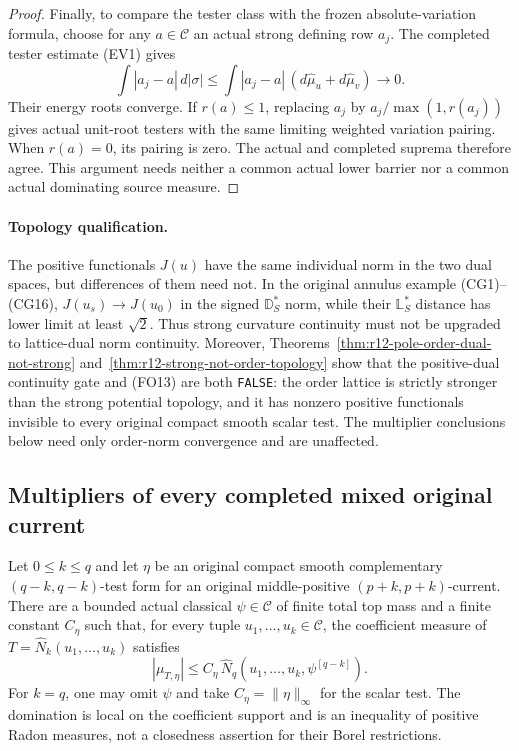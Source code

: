 \begin{proof}
Finally, to compare the tester class with the frozen
absolute-variation formula, choose for any $a\in\mathscr C$
an actual strong defining row $a_j$.  The completed tester
estimate \textup{(EV1)} gives
\[
 \int|a_j-a|\,d|\sigma|
  \le\int|a_j-a|\,(d\widehat\mu_u+d\widehat\mu_v)
                                      \longrightarrow0.
\]
Their energy roots converge.  If $r(a)\le1$, replacing
$a_j$ by $a_j/\max(1,r(a_j))$ gives actual unit-root
testers with the same limiting weighted variation
pairing.  When $r(a)=0$, its pairing is zero.  The
actual and completed suprema therefore agree.  This
argument needs neither a common actual lower barrier
nor a common actual dominating source measure.
\end{proof}

\paragraph{Topology qualification.}
The positive functionals $J(u)$ have the same individual
norm in the two dual spaces, but differences of them need
not.  In the original annulus example \textup{(CG1)--(CG16)},
$J(u_s)\to J(u_0)$ in the signed $\mathbb D_S^*$ norm,
while their $\mathbb L_S^*$ distance has lower limit at
least $\sqrt2$.  Thus strong curvature continuity must not
be upgraded to lattice-dual norm continuity.  Moreover,
Theorems~\ref{thm:r12-pole-order-dual-not-strong}
and~\ref{thm:r12-strong-not-order-topology} show that
the positive-dual continuity gate and \textup{(FO13)}
are both \texttt{FALSE}: the order lattice is strictly
stronger than the strong potential topology, and it has
nonzero positive functionals invisible to every original
compact smooth scalar test.  The multiplier conclusions
below need only order-norm convergence and are unaffected.

\subsection{Multipliers of every completed mixed original current}

\begin{lemma}
\label{lem:r12-trace-completing-potential}
Let $0\le k\le q$ and let $\eta$ be an original compact
smooth complementary $(q-k,q-k)$-test form for an original
middle-positive $(p+k,p+k)$-current.  There are a bounded
actual classical $\psi\in\mathscr C$ of finite total top
mass and a finite constant $C_\eta$ such that, for every
tuple $u_1,\ldots,u_k\in\mathscr C$, the coefficient
measure of $T=\widehat N_k(u_1,\ldots,u_k)$ satisfies
\[
 |\mu_{T,\eta}|
        \le C_\eta\,
             \widehat N_q(u_1,\ldots,u_k,\psi^{[q-k]}).
 \tag{OL11}
\]
For $k=q$, one may omit $\psi$ and take
$C_\eta=\|\eta\|_\infty$ for the scalar test.
The domination is local on the coefficient support and
is an inequality of positive Radon measures, not a
closedness assertion for their Borel restrictions.
\end{lemma}

